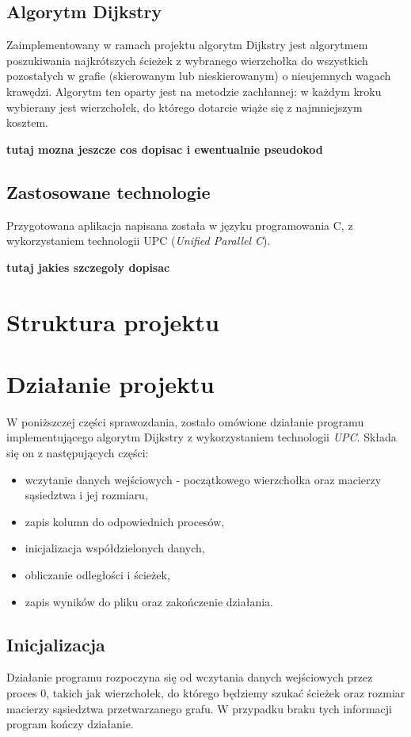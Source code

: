 \documentclass[12pt]{article}
\begin{document}
\subsection{Algorytm Dijkstry}
Zaimplementowany w ramach projektu algorytm Dijkstry jest algorytmem poszukiwania najkrótszych ścieżek z wybranego wierzchołka do wszystkich pozostałych w grafie (skierowanym lub nieskierowanym) o nieujemnych wagach krawędzi. Algorytm ten oparty jest na metodzie zachłannej: w każdym kroku wybierany jest wierzchołek, do którego dotarcie wiąże się z najmniejszym kosztem.

\textbf{tutaj mozna jeszcze cos dopisac i ewentualnie pseudokod}


\subsection{Zastosowane technologie}
Przygotowana aplikacja napisana została w języku programowania C, z wykorzystaniem technologii UPC (\textit{Unified Parallel C}). 

\textbf{tutaj jakies szczegoly dopisac}


\clearpage
\section{Struktura projektu}

\clearpage
\section{Działanie projektu}
W poniższczej części sprawozdania, zostało omówione działanie programu implementującego algorytm Dijkstry z wykorzystaniem technologii \textit{UPC}. Składa się on z następujących części:
\begin{itemize}
\item wczytanie danych wejściowych - początkowego wierzchołka oraz macierzy sąsiedztwa i jej rozmiaru,
\item zapis kolumn do odpowiednich procesów,
\item inicjalizacja współdzielonych danych,
\item obliczanie odległości i ścieżek,
\item zapis wyników do pliku oraz zakończenie działania.

\end{itemize}

\subsection{Inicjalizacja}
Działanie programu rozpoczyna się od wczytania danych wejściowych przez proces 0, takich jak wierzchołek, do którego będziemy szukać ścieżek oraz rozmiar macierzy sąsiedztwa przetwarzanego grafu. W przypadku braku tych informacji program kończy działanie.
\end{document}
